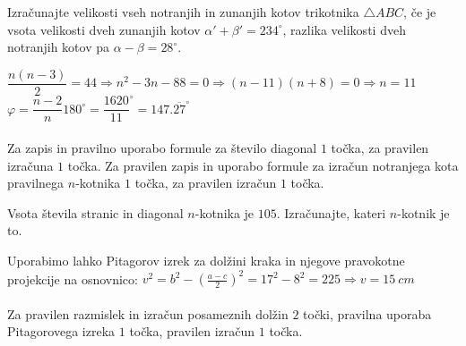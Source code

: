 \documentclass[addpoints]{exam}
\begin{document}
\begin{questions}


    \question[5]
        Izračunajte velikosti vseh notranjih in zunanjih kotov trikotnika $\triangle ABC$, 
        če je vsota velikosti dveh zunanjih kotov $\alpha'+\beta'=234^\circ$, razlika velikosti dveh notranjih kotov pa $\alpha-\beta=28^\circ$.

    \begin{solution}[10cm]
        $ \dfrac{n(n-3)}{2}=44 \Rightarrow n^2-3n-88=0 \Rightarrow (n-11)(n+8)=0 \Rightarrow n=11 $ \\
        $ \varphi=\dfrac{n-2}{n}180^\circ=\dfrac{1620}{11}^\circ=147.\overline{27}^\circ $ \\ \\
        Za zapis in pravilno uporabo formule za število diagonal $1$ točka, za pravilen izračuna $1$ točka. 
        Za pravilen zapis in uporabo formule za izračun notranjega kota pravilnega $n$-kotnika $1$ točka, za pravilen izračun $1$ točka.
    \end{solution}







    \question[3]
        Vsota števila stranic in diagonal $n$-kotnika je $105$. Izračunajte, kateri $n$-kotnik je to.

    \begin{solution}[4cm]
        Uporabimo lahko Pitagorov izrek za dolžini kraka in njegove pravokotne projekcije na osnovnico: $v^2=b^2-\left(\frac{a-c}{2}\right)^2=17^2-8^2=225 \Rightarrow v=15~cm$ \\ \\
        Za pravilen razmislek in izračun posameznih dolžin $2$ točki, pravilna uporaba Pitagorovega izreka $1$ točka, pravilen izračun $1$ točka.
    \end{solution}



\end{questions}
\end{document}
